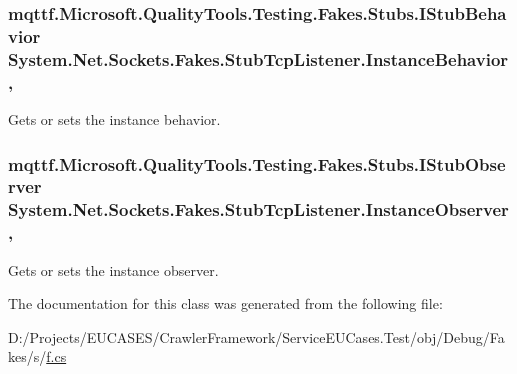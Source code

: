 \hypertarget{class_system_1_1_net_1_1_sockets_1_1_fakes_1_1_stub_tcp_listener_a970d495846686ec71eb37c689fb4d44e}{
\subsubsection[{Instance\-Behavior}]{\setlength{\rightskip}{0pt plus 5cm}mqttf.\-Microsoft.\-Quality\-Tools.\-Testing.\-Fakes.\-Stubs.\-I\-Stub\-Behavior System.\-Net.\-Sockets.\-Fakes.\-Stub\-Tcp\-Listener.\-Instance\-Behavior\hspace{0.3cm}{\ttfamily [get]}, {\ttfamily [set]}}}\label{class_system_1_1_net_1_1_sockets_1_1_fakes_1_1_stub_tcp_listener_a970d495846686ec71eb37c689fb4d44e}


Gets or sets the instance behavior.

\hypertarget{class_system_1_1_net_1_1_sockets_1_1_fakes_1_1_stub_tcp_listener_a48c24410dd8407d9a80d41d26f680035}{
\subsubsection[{Instance\-Observer}]{\setlength{\rightskip}{0pt plus 5cm}mqttf.\-Microsoft.\-Quality\-Tools.\-Testing.\-Fakes.\-Stubs.\-I\-Stub\-Observer System.\-Net.\-Sockets.\-Fakes.\-Stub\-Tcp\-Listener.\-Instance\-Observer\hspace{0.3cm}{\ttfamily [get]}, {\ttfamily [set]}}}\label{class_system_1_1_net_1_1_sockets_1_1_fakes_1_1_stub_tcp_listener_a48c24410dd8407d9a80d41d26f680035}


Gets or sets the instance observer.



The documentation for this class was generated from the following file\-:\begin{DoxyCompactItemize}
\item 
D\-:/\-Projects/\-E\-U\-C\-A\-S\-E\-S/\-Crawler\-Framework/\-Service\-E\-U\-Cases.\-Test/obj/\-Debug/\-Fakes/s/\hyperlink{s_2f_8cs}{f.\-cs}\end{DoxyCompactItemize}
